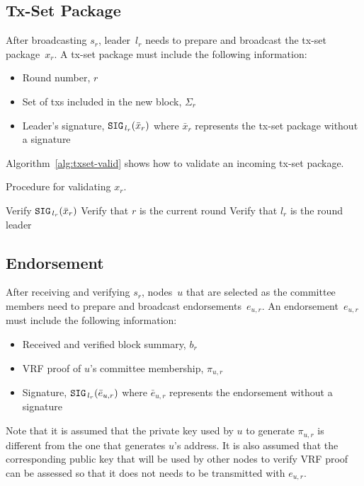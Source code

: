 \documentclass{article}
\begin{document}
\subsection{Tx-Set Package}
After broadcasting $s_r$, leader~$l_r$ needs to prepare and broadcast the tx-set package~$x_r$. A tx-set package must include the following information:
\begin{itemize}
    \item Round number, $r$
    \item Set of txs included in the new block, $\Sigma_r$
    \item Leader's signature, ${\tt SIG}_{\,l_r}(\bar{x}_r)$ where $\bar{x}_r$ represents the tx-set package without a signature
\end{itemize}

Algorithm~\ref{alg:txset-valid} shows how to validate an incoming tx-set package.

\begin{algorithm}[H]
\caption{Procedure for validating $x_r$.}
\label{alg:txset-valid}
\begin{spacing}{1.2}
\begin{algorithmic}[1]
    \vspace{1ex}
    \State Verify ${\tt SIG}_{\,l_r}(\bar{x}_r)$
    \State Verify that $r$ is the current round
    \State Verify that $l_r$ is the round leader
\end{algorithmic}
\end{spacing}
\end{algorithm}

\subsection{Endorsement}

After receiving and verifying $s_r$, nodes~$u$ that are selected as the committee members need to prepare and broadcast endorsements~$e_{u,r}$. An endorsement~$e_{u,r}$ must include the following information:
\begin{itemize}
    \item Received and verified block summary, $b_r$
    \item VRF proof of $u$'s committee membership, $\pi_{u,r}$
    \item Signature, ${\tt SIG}_{\,l_r}(\bar{e}_{u,r})$ where $\bar{e}_{u,r}$ represents the endorsement without a signature
\end{itemize}

{\color{red} Note that it is assumed that the private key used by $u$ to generate $\pi_{u,r}$ is different from the one that generates $u$'s address. It is also assumed that the corresponding public key that will be used by other nodes to verify VRF proof can be assessed so that it does not needs to be transmitted with $e_{u,r}$.}
\end{document}
